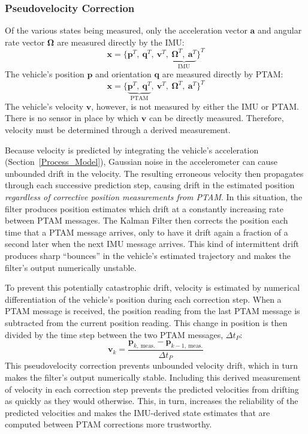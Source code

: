 \subsubsection{Pseudovelocity Correction}

Of the various states being measured, only the acceleration vector $\mathbf{a}$ and angular rate vector $\bm{\Omega}$ are measured directly by the IMU:
%
\begin{equation*}
\mathbf{x} = 
\Big\{   
    \mathbf{p}^{T},\
    \mathbf{q}^{T},\
    \mathbf{v}^{T},\
    \underbrace{
    \bm{\Omega}^{T},\
    \mathbf{a}^{T}}_{\text{IMU}}
\Big\} ^{T}
\end{equation*}
%
The vehicle's position $\mathbf{p}$ and orientation $\mathbf{q}$ are measured directly by PTAM:
%
\begin{equation*}
\mathbf{x} = 
\Big\{
\underbrace{
    \mathbf{p}^{T},\
    \mathbf{q}^{T}}_{\text{PTAM}},\
    \mathbf{v}^{T},\
    \bm{\Omega}^{T},\
    \mathbf{a}^{T}
\Big\} ^{T}
\end{equation*}
%
The vehicle's velocity $\mathbf{v}$, however, is not measured by either the IMU or PTAM. There is no sensor in place by which $\mathbf{v}$ can be directly measured. Therefore, velocity must be determined through a derived measurement.

Because velocity is predicted by integrating the vehicle's acceleration (Section~\ref{Process_Model}), Gaussian noise in the accelerometer can cause unbounded drift in the velocity. The resulting erroneous velocity then propagates through each successive prediction step, causing drift in the estimated position \textit{regardless of corrective position measurements from PTAM}. In this situation, the filter produces position estimates which drift at a constantly increasing rate between PTAM messages. The Kalman Filter then corrects the position each time that a PTAM message arrives, only to have it drift again a fraction of a second later when the next IMU message arrives. This kind of intermittent drift produces sharp ``bounces'' in the vehicle's estimated trajectory and makes the filter's output numerically unstable.

To prevent this potentially catastrophic drift, velocity is estimated by numerical differentiation of the vehicle's position during each correction step. When a PTAM message is received, the position reading from the last PTAM message is subtracted from the current position reading. This change in position is then divided by the time step between the two PTAM messages, $\Delta t_{P}$:
%
\begin{equation}
\mathbf{v}_{k} = \frac{\mathbf{p}_{k,\ \text{meas.}} - \mathbf{p}_{k-1,\ \text{meas.}}}{\Delta t_{P}}
\end{equation}
%
This pseudovelocity correction prevents unbounded velocity drift, which in turn makes the filter's output numerically stable. Including this derived measurement of velocity in each correction step prevents the predicted velocities from drifting as quickly as they would otherwise. This, in turn, increases the reliability of the predicted velocities and makes the IMU-derived state estimates that are computed between PTAM corrections more trustworthy.

